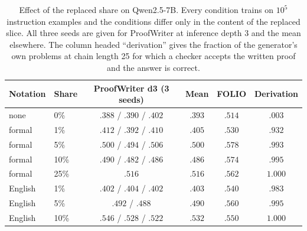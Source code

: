 \begin{table}[t]
\caption{Effect of the replaced share on Qwen2.5-7B. Every condition trains on
$10^5$ instruction examples and the conditions differ only in the content of
the replaced slice. All three seeds are given for ProofWriter at inference
depth 3 and the mean elsewhere. The column headed ``derivation'' gives the
fraction of the generator's own problems at chain length 25 for which a checker
accepts the written proof and the answer is correct.}
\label{tab:dose}
\begin{center}
\begin{tabular}{llcccc}
\toprule
Notation & Share & ProofWriter d3 (3 seeds) & Mean & FOLIO & Derivation \\
\midrule
none     & 0\%   & $.388$ / $.390$ / $.402$ & $.393$ & $.514$ & $.003$ \\
formal   & 1\%   & $.412$ / $.392$ / $.410$ & $.405$ & $.530$ & $.932$ \\
formal   & 5\%   & $.500$ / $.494$ / $.506$ & $\mathbf{.500}$ & $\mathbf{.578}$ & $.993$ \\
formal   & 10\%  & $.490$ / $.482$ / $.486$ & $.486$ & $.574$ & $.995$ \\
formal   & 25\%  & $.516$ & $.516$ & $.562$ & $1.000$ \\
English  & 1\%   & $.402$ / $.404$ / $.402$ & $.403$ & $.540$ & $.983$ \\
English  & 5\%   & $.492$ / $.488$ & $.490$ & $.560$ & $.995$ \\
English  & 10\%  & $.546$ / $.528$ / $.522$ & $\mathbf{.532}$ & $.550$ & $1.000$ \\
\bottomrule
\end{tabular}
\end{center}
\end{table}